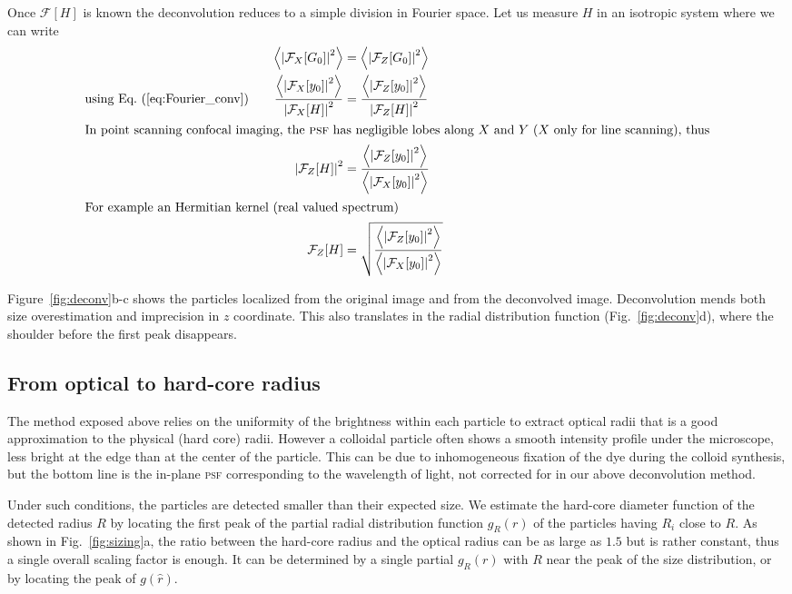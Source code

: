 \documentclass[8.5pt,twoside,twocolumn]{article}
\begin{document}
Once $\mathcal{F}[H]$ is known the deconvolution reduces to a simple division in Fourier space. Let us measure $H$ in an isotropic system where we can write
\begin{align}
\left\langle \left|\mathcal{F}_X[G_0]\right|^2 \right\rangle  &= \left\langle \left|\mathcal{F}_Z[G_0]\right|^2 \right\rangle \\
\text{using Eq.~(\ref{eq:Fourier_conv})}\qquad 
\frac{\left\langle\left|\mathcal{F}_X[y_0]\right|^2 \right\rangle}{\left|\mathcal{F}_X[H]\right|^2}  &= \frac{\left\langle \left|\mathcal{F}_Z[y_0]\right|^2\right\rangle}{\left|\mathcal{F}_Z[H]\right|^2} \\
\intertext{In point scanning confocal imaging, the \textsc{psf} has negligible lobes along $X$ and $Y$ ($X$ only for line scanning), thus}
\left|\mathcal{F}_Z[H]\right|^2 &= \frac{\left\langle \left|\mathcal{F}_Z[y_0]\right|^2\right\rangle}{\left\langle\left|\mathcal{F}_X[y_0]\right|^2 \right\rangle}\\
\intertext{For example an Hermitian kernel (real valued spectrum)}
\mathcal{F}_Z[H] &= \sqrt{\frac{\left\langle \left|\mathcal{F}_Z[y_0]\right|^2\right\rangle}{\left\langle\left|\mathcal{F}_X[y_0]\right|^2 \right\rangle}}
\end{align}

Figure~\ref{fig:deconv}b-c shows the particles localized from the original image and from the deconvolved image. Deconvolution mends both size overestimation and imprecision in $z$ coordinate. This also translates in the radial distribution function (Fig.~\ref{fig:deconv}d), where the shoulder before the first peak disappears.

\subsection*{From optical to hard-core radius}

The method exposed above relies on the uniformity of the brightness within each particle to extract optical radii that is a good approximation to the physical (hard core) radii. However a colloidal particle often shows a smooth intensity profile under the microscope, less bright at the edge than at the center of the particle. This can be due to inhomogeneous fixation of the dye during the colloid synthesis, but the bottom line is the in-plane \textsc{psf} corresponding to the wavelength of light, not corrected for in our above deconvolution method.

Under such conditions, the particles are detected smaller than their expected size. We estimate the hard-core diameter function of the detected radius $R$ by locating the first peak of the partial radial distribution function $g_R(r)$ of the particles having $R_i$ close to $R$. As shown in Fig.~\ref{fig:sizing}a, the ratio between the hard-core radius and the optical radius can be as large as $1.5$ but is rather constant, thus a single overall scaling factor is enough. It can be determined by a single partial $g_R(r)$ with $R$ near the peak of the size distribution, or by locating the peak of $g(\hat{r})$. 
\end{document}
